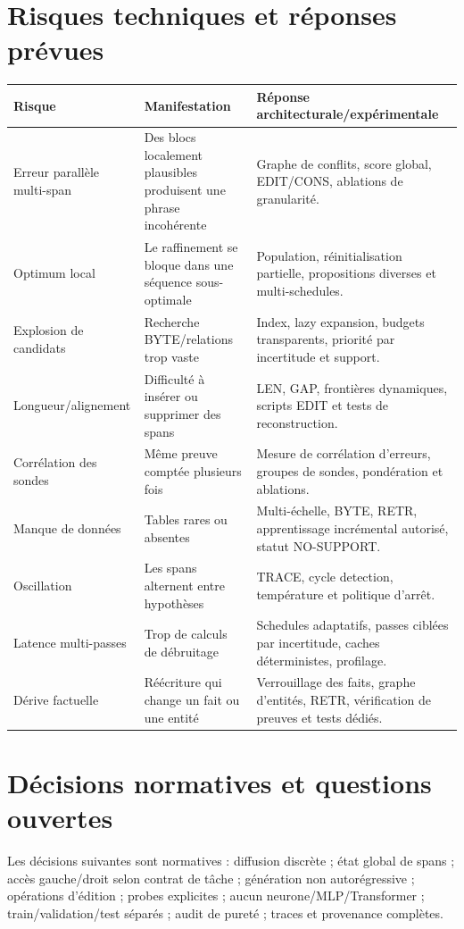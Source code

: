 \documentclass[11pt,a4paper,oneside]{report}
\begin{document}
\chapter{Risques techniques et réponses prévues}
\begin{longtable}{p{3.4cm}p{5.2cm}p{4.9cm}}
\toprule Risque & Manifestation & Réponse architecturale/expérimentale\\
\midrule
Erreur parallèle multi-span & Des blocs localement plausibles produisent une phrase incohérente & Graphe de conflits, score global, EDIT/CONS, ablations de granularité.\\
Optimum local & Le raffinement se bloque dans une séquence sous-optimale & Population, réinitialisation partielle, propositions diverses et multi-schedules.\\
Explosion de candidats & Recherche BYTE/relations trop vaste & Index, lazy expansion, budgets transparents, priorité par incertitude et support.\\
Longueur/\newline alignement & Difficulté à insérer ou supprimer des spans & LEN, GAP, frontières dynamiques, scripts EDIT et tests de reconstruction.\\
Corrélation des sondes & Même preuve comptée plusieurs fois & Mesure de corrélation d'erreurs, groupes de sondes, pondération et ablations.\\
Manque de données & Tables rares ou absentes & Multi-échelle, BYTE, RETR, apprentissage incrémental autorisé, statut NO-SUPPORT.\\
Oscillation & Les spans alternent entre hypothèses & TRACE, cycle detection, température et politique d'arrêt.\\
Latence multi-passes & Trop de calculs de débruitage & Schedules adaptatifs, passes ciblées par incertitude, caches déterministes, profilage.\\
Dérive factuelle & Réécriture qui change un fait ou une entité & Verrouillage des faits, graphe d'entités, RETR, vérification de preuves et tests dédiés.\\
\bottomrule
\end{longtable}

\chapter{Décisions normatives et questions ouvertes}
Les décisions suivantes sont normatives : diffusion discrète ; état global de spans ; accès gauche/droit selon contrat de tâche ; génération non autorégressive ; opérations d'édition ; probes explicites ; aucun neurone/MLP/Transformer ; train/validation/test séparés ; audit de pureté ; traces et provenance complètes.
\end{document}

